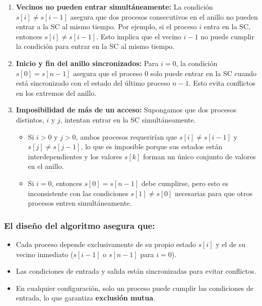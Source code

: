 \documentclass[a4paper,12pt]{article}
\begin{document}
\begin{enumerate}
    \item \textbf{Vecinos no pueden entrar simultáneamente:}  
    La condición $s[i] \neq s[i-1]$ asegura que dos procesos consecutivos en el anillo no pueden entrar a la SC al mismo tiempo.  
    Por ejemplo, si el proceso $i$ entra en la SC, entonces $s[i] \neq s[i-1]$. Esto implica que el vecino $i-1$ no puede cumplir la condición para entrar en la SC al mismo tiempo.

    \item \textbf{Inicio y fin del anillo sincronizados:}  
    Para $i = 0$, la condición $s[0] = s[n-1]$ asegura que el proceso $0$ solo puede entrar en la SC cuando está sincronizado con el estado del último proceso $n-1$. Esto evita conflictos en los extremos del anillo.

    \item \textbf{Imposibilidad de más de un acceso:}  
    Supongamos que dos procesos distintos, $i$ y $j$, intentan entrar en la SC simultáneamente.
    \begin{itemize}
        \item Si $i > 0$ y $j > 0$, ambos procesos requerirían que $s[i] \neq s[i-1]$ y $s[j] \neq s[j-1]$, lo que es imposible porque sus estados están interdependientes y los valores $s[k]$ forman un único conjunto de valores en el anillo.
        \item Si $i = 0$, entonces $s[0] = s[n-1]$ debe cumplirse, pero esto es inconsistente con las condiciones $s[1] \neq s[0]$ necesarias para que otros procesos entren simultáneamente.
    \end{itemize}
\end{enumerate}


\subsubsection{El diseño del algoritmo asegura que:}

\begin{itemize}
    \item Cada proceso depende exclusivamente de su propio estado $s[i]$ y el de su vecino inmediato ($s[i-1]$ o $s[n-1]$ para $i = 0$).
    \item Las condiciones de entrada y salida están sincronizadas para evitar conflictos.
    \item En cualquier configuración, solo un proceso puede cumplir las condiciones de entrada, lo que garantiza \textbf{exclusión mutua}.
\end{itemize}
\end{document}
